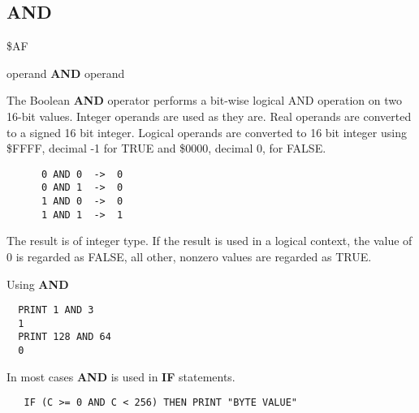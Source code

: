 \subsection{AND}
\begin{description}[leftmargin=2cm,style=nextline]
\item [Token:] \$AF
\item [Format:] operand {\bf AND} operand
\item [Usage:]  The Boolean {\bf AND} operator performs a bit-wise
                logical AND operation on two 16-bit values.
                Integer operands are used as they are.
                Real operands are converted to a signed 16 bit integer.
                Logical operands are converted to 16 bit integer
                using \$FFFF, decimal -1 for TRUE
                and \$0000, decimal 0, for FALSE.

   \begin{verbatim}
      0 AND 0  ->  0
      0 AND 1  ->  0
      1 AND 0  ->  0
      1 AND 1  ->  1
   \end{verbatim}

\item [Remarks:] The result is of integer type.
                 If the result is used in a logical context,
                 the value of 0 is regarded as FALSE,
                 all other, nonzero values are regarded as TRUE.
\item [Example:] Using {\bf AND}

\begin{tcolorbox}[colback=black,coltext=white]
\verbatimfont{\codefont}
\begin{verbatim}
  PRINT 1 AND 3
  1
  PRINT 128 AND 64
  0
\end{verbatim}
\end{tcolorbox}

In most cases {\bf AND} is used in {\bf IF} statements.

\begin{tcolorbox}[colback=black,coltext=white]
\verbatimfont{\codefont}
\begin{verbatim}
   IF (C >= 0 AND C < 256) THEN PRINT "BYTE VALUE"
\end{verbatim}
\end{tcolorbox}
\end{description}


\newpage
